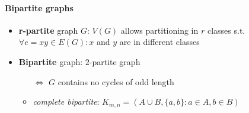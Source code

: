 \paragraph{Bipartite graphs}
\begin{itemize}
  \item \textbf{r-partite} graph $ G $: $ V(G) $ allows partitioning in $ r $ classes s.t. $ \forall e=xy \in E(G) : x $ and $ y $ are in different classes
  \item \textbf{Bipartite} graph: $ 2 $-partite graph
  \begin{itemize}
    \item[$ \Leftrightarrow $] $ G $ contains no cycles of odd length
    \item \emph{complete bipartite}: $ K_{m,n} = (A \cup B, \{ a,b \} : a \in A, b \in B) $ 
  \end{itemize}
\end{itemize}

